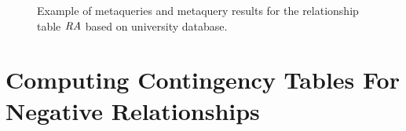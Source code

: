 \documentclass{vldb}
\begin{document}
\begin{figure}[htb]
\begin{center}
\caption{Example of metaqueries and metaquery results for the relationship table $\mathit{RA}$  based on university database.
~\label{fig:meta-query} }
\end{center}
\end{figure}


\section{Computing Contingency Tables For Negative Relationships} \label{sec:cta}
\end{document}
